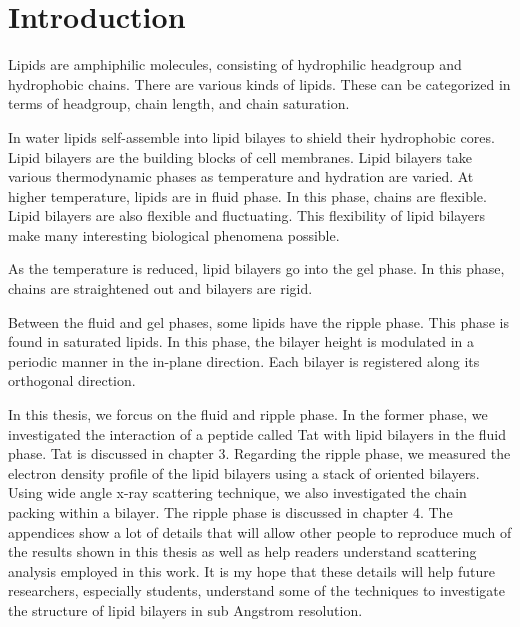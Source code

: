 \chapter{Introduction}
Lipids are amphiphilic molecules, consisting of hydrophilic headgroup
and hydrophobic chains. There are various kinds of lipids. These can be 
categorized in terms of headgroup, chain length, and chain saturation.

In water lipids self-assemble into lipid bilayes to shield their hydrophobic 
cores. Lipid bilayers are the building blocks of cell membranes. Lipid bilayers 
take various thermodynamic phases
as temperature and hydration are varied.
At higher temperature, lipids are in fluid phase. In this phase, chains
are flexible. Lipid bilayers are also flexible and fluctuating. This
flexibility of lipid bilayers make many interesting biological
phenomena possible. 

As the temperature is reduced, lipid bilayers go into the gel phase.
In this phase, chains are straightened out and bilayers are rigid.

Between the fluid and gel phases, some lipids have the ripple phase.
This phase is found in saturated lipids. In this phase, the bilayer
height is modulated in a periodic manner in the in-plane direction.
Each bilayer is registered along its orthogonal direction.

In this thesis, we forcus on the fluid and ripple phase. In the former phase,
we investigated the interaction of a peptide called Tat with lipid bilayers
in the fluid phase. 
Tat is discussed in chapter 3.
Regarding the ripple phase, we measured the electron density profile of the lipid
bilayers using a stack of oriented bilayers. Using wide angle x-ray scattering
technique, we also investigated the chain packing within a bilayer. 
The ripple phase is discussed in chapter 4. 
The appendices show a lot of details that will
allow other people to reproduce much of the results shown in this thesis 
as well as help readers understand scattering analysis employed in this work.
It is my hope that these details will help future researchers,
especially students, understand some of the techniques to investigate the
structure of lipid bilayers in sub Angstrom resolution.